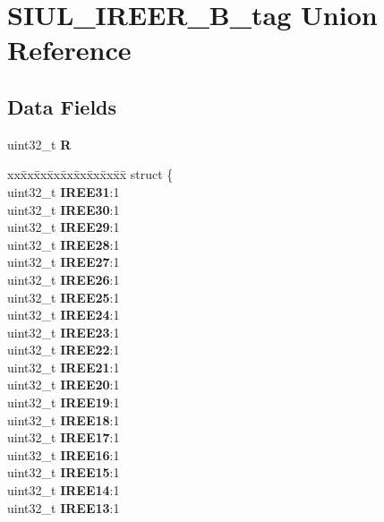 \hypertarget{unionSIUL__IREER__32B__tag}{}\section{S\+I\+U\+L\+\_\+\+I\+R\+E\+E\+R\+\_\+B\+\_\+tag Union Reference}
\label{unionSIUL__IREER__32B__tag}
\subsection*{Data Fields}
\begin{DoxyCompactItemize}
\item 
\mbox{\label{unionSIUL__IREER__32B__tag_ab45d5d73967ff2704237fa7d4dac9cda}} 
uint32\+\_\+t {\bfseries R}
\item 
\mbox{\label{unionSIUL__IREER__32B__tag_aeb98deed9056fde311f701b62be93809}} 
\begin{tabbing}
xx\=xx\=xx\=xx\=xx\=xx\=xx\=xx\=xx\=\kill
struct \{\\
\>uint32\_t {\bfseries IREE31}:1\\
\>uint32\_t {\bfseries IREE30}:1\\
\>uint32\_t {\bfseries IREE29}:1\\
\>uint32\_t {\bfseries IREE28}:1\\
\>uint32\_t {\bfseries IREE27}:1\\
\>uint32\_t {\bfseries IREE26}:1\\
\>uint32\_t {\bfseries IREE25}:1\\
\>uint32\_t {\bfseries IREE24}:1\\
\>uint32\_t {\bfseries IREE23}:1\\
\>uint32\_t {\bfseries IREE22}:1\\
\>uint32\_t {\bfseries IREE21}:1\\
\>uint32\_t {\bfseries IREE20}:1\\
\>uint32\_t {\bfseries IREE19}:1\\
\>uint32\_t {\bfseries IREE18}:1\\
\>uint32\_t {\bfseries IREE17}:1\\
\>uint32\_t {\bfseries IREE16}:1\\
\>uint32\_t {\bfseries IREE15}:1\\
\>uint32\_t {\bfseries IREE14}:1\\
\>uint32\_t {\bfseries IREE13}:1\\

\end{tabbing}
\end{DoxyCompactItemize}
